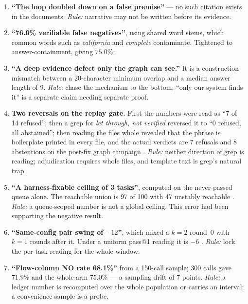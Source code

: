 \begin{enumerate}[leftmargin=2.2em]
  \item \textbf{``The loop doubled down on a false premise''} --- no such
        citation exists in the documents. \emph{Rule:} narrative may not be
        written before its evidence.

  \item \textbf{``76.6\% verifiable false negatives''}, using shared word
        stems, which common words such as \emph{california} and
        \emph{complete} contaminate. Tightened to answer-containment,
        giving $75.0\%$.

  \item \textbf{``A deep evidence defect only the graph can see.''} It is a
        construction mismatch between a 20-character minimum overlap and a
        median answer length of 9. \emph{Rule:} chase the mechanism to the
        bottom; ``only our system finds it'' is a separate claim needing
        separate proof.

  \item \textbf{Two reversals on the replay gate.} First the numbers were
        read as ``7 of 14 refused''; then a grep for
        \emph{let through, not verified} reversed it to ``0 refused, all
        abstained''; then reading the files whole revealed that the phrase
        is boilerplate printed in every file, and the actual verdicts are 7
        refusals and 8 abstentions on the post-fix graph campaign . \emph{Rule:}
        neither direction of grep is reading; adjudication requires whole
        files, and template text is grep's natural trap.

  \item \textbf{``A harness-fixable ceiling of 3 tasks''}, computed on the
        never-passed queue alone. The reachable union is 97 of 100 with 47
        unstably reachable . \emph{Rule:} a queue-scoped number is
        not a global ceiling. This error had been supporting the negative
        result.

  \item \textbf{``Same-config pair swing of $-12$''}, which mixed a $k{=}2$
        round~0 with $k{=}1$ rounds after it. Under a uniform pass@1
        reading it is $-6$ . \emph{Rule:} lock the per-task reading
        for the whole window.

  \item \textbf{``Flow-column NO rate 68.1\%''} from a 150-call sample; 300
        calls gave $71.9\%$ and the whole arm $75.0\%$ --- a sampling drift
        of 7 points. \emph{Rule:} a ledger number is recomputed over the
        whole population or carries an interval; a convenience sample is a
        probe.


\end{enumerate}
